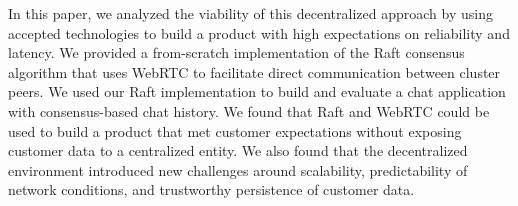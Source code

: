 \documentclass[11pt,twocolumn]{article}
\begin{document}
In this paper, we analyzed the viability of this decentralized approach by using accepted technologies to build a product with high expectations on reliability and latency. We provided a from-scratch implementation of the Raft consensus algorithm that uses WebRTC to facilitate direct communication between cluster peers. We used our Raft implementation to build and evaluate a chat application with consensus-based chat history. We found that Raft and WebRTC could be used to build a product that met customer expectations without exposing customer data to a centralized entity. We also found that the decentralized environment introduced new challenges around scalability, predictability of network conditions, and trustworthy persistence of customer data.

\printbibliography[type=book]
\end{document}
